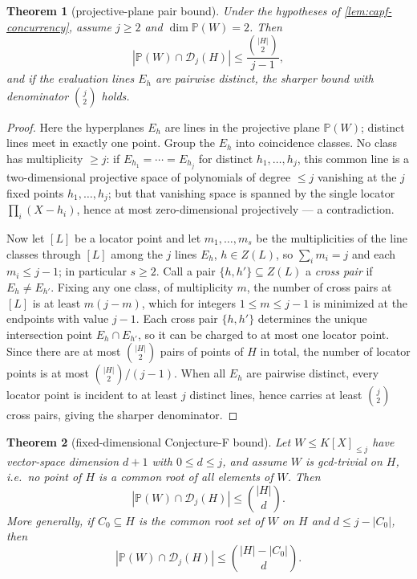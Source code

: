 \documentclass[11pt]{article}
\newtheorem{theorem}{Theorem}[section]
\theoremstyle{definition}
\theoremstyle{remark}
\providecommand{\Dloc}{\mathcal D}
\providecommand{\PP}{\mathbb P}
\begin{document}
\begin{theorem}[projective-plane pair bound]\label{thm:capf-dim2}
Under the hypotheses of \cref{lem:capf-concurrency}, assume $j\ge2$ and $\dim\PP(W)=2$.  Then
\[
        |\PP(W)\cap\Dloc_j(H)|
        \le
        \frac{\binom{|H|}{2}}{j-1},
\]
and if the evaluation lines $E_h$ are pairwise distinct, the sharper bound with denominator $\binom j2$ holds.
\end{theorem}

\begin{proof}
Here the hyperplanes $E_h$ are lines in the projective plane $\PP(W)$; distinct lines meet in exactly one point.  Group the $E_h$ into coincidence classes.  No class has multiplicity $\ge j$: if $E_{h_1}=\cdots=E_{h_j}$ for distinct $h_1,\ldots,h_j$, this common line is a two-dimensional projective space of polynomials of degree $\le j$ vanishing at the $j$ fixed points $h_1,\ldots,h_j$; but that vanishing space is spanned by the single locator $\prod_i(X-h_i)$, hence at most zero-dimensional projectively --- a contradiction.

Now let $[L]$ be a locator point and let $m_1,\ldots,m_s$ be the multiplicities of the line classes through $[L]$ among the $j$ lines $E_h$, $h\in Z(L)$, so $\sum_i m_i=j$ and each $m_i\le j-1$; in particular $s\ge2$.  Call a pair $\{h,h'\}\subseteq Z(L)$ a \emph{cross pair} if $E_h\ne E_{h'}$.  Fixing any one class, of multiplicity $m$, the number of cross pairs at $[L]$ is at least $m(j-m)$, which for integers $1\le m\le j-1$ is minimized at the endpoints with value $j-1$.  Each cross pair $\{h,h'\}$ determines the unique intersection point $E_h\cap E_{h'}$, so it can be charged to at most one locator point.  Since there are at most $\binom{|H|}2$ pairs of points of $H$ in total, the number of locator points is at most $\binom{|H|}2/(j-1)$.  When all $E_h$ are pairwise distinct, every locator point is incident to at least $j$ distinct lines, hence carries at least $\binom j2$ cross pairs, giving the sharper denominator.
\end{proof}

\begin{theorem}[fixed-dimensional Conjecture-F bound]\label{thm:capf-fixeddim}
Let $W\le K[X]_{\le j}$ have vector-space dimension $d+1$ with $0\le d\le j$, and assume $W$ is gcd-trivial on $H$, i.e.\ no point of $H$ is a common root of all elements of $W$.  Then
\[
        |\PP(W)\cap\Dloc_j(H)|\le \binom{|H|}{d}.
\]
More generally, if $C_0\subseteq H$ is the common root set of $W$ on $H$ and $d\le j-|C_0|$, then
\[
        |\PP(W)\cap\Dloc_j(H)|\le \binom{|H|-|C_0|}{d}.
\]
\end{theorem}
\end{document}
